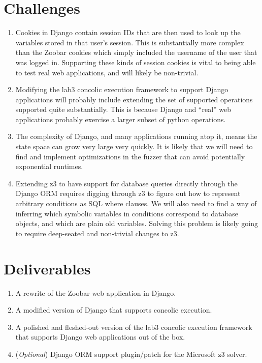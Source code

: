 \documentclass[a4page]{scrartcl}
\begin{document}
\section{Challenges}
\begin{enumerate}
	\item Cookies in Django contain session IDs that are then used to look
		up the variables stored in that user's session. This is
		substantially more complex than the Zoobar cookies which simply
		included the username of the user that was logged in.
		Supporting these kinds of session cookies is vital to being
		able to test real web applications, and will likely be
		non-trivial.
	\item Modifying the lab3 concolic execution framework to support Django
		applications will probably include extending the set of
		supported operations supported quite substantially. This is
		because Django and ``real'' web applications probably exercise
		a larger subset of python operations.
	\item The complexity of Django, and many applications running atop it,
		means the state space can grow very large very quickly. It is
		likely that we will need to find and implement optimizations in
		the fuzzer that can avoid potentially exponential runtimes.
	\item Extending z3 to have support for database queries directly
		through the Django ORM requires digging through z3 to figure
		out how to represent arbitrary conditions as SQL where clauses.
		We will also need to find a way of inferring which symbolic
		variables in conditions correspond to database objects, and
		which are plain old variables. Solving this problem is likely
		going to require deep-seated and non-trivial changes to z3.
\end{enumerate}

\section{Deliverables}
\begin{enumerate}
	\item A rewrite of the Zoobar web application in Django.
	\item A modified version of Django that supports concolic execution.
	\item A polished and fleshed-out version of the lab3 concolic execution
		framework that supports Django web applications out of the box.
	\item (\textit{Optional}) Django ORM support plugin/patch for the
		Microsoft z3 solver.
\end{enumerate}
\end{document}
